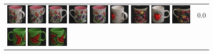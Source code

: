 \begin{figure}[tbp]
\begin{center}
\begin{tabular}{m{11cm} | m{3cm} |}
\includegraphics[width=1cm]{coil/beeld-10.eps}
\includegraphics[width=1cm]{coil/beeld-9.eps}
\includegraphics[width=1cm]{coil/beeld-6.eps}
\includegraphics[width=1cm]{coil/beeld-7.eps}
\includegraphics[width=1cm]{coil/beeld-8.eps}
\includegraphics[width=1cm]{coil/beeld-40.eps}
\includegraphics[width=1cm]{coil/beeld-62.eps}
\includegraphics[width=1cm]{coil/beeld-36.eps}
\includegraphics[width=1cm]{coil/beeld-61.eps}
& {\scriptsize 0.0}
\\
\includegraphics[width=1cm]{coil/beeld-31.eps}
\includegraphics[width=1cm]{coil/beeld-30.eps}
\includegraphics[width=1cm]{coil/beeld-33.eps}

\end{tabular}
\end{center}
\end{figure}
